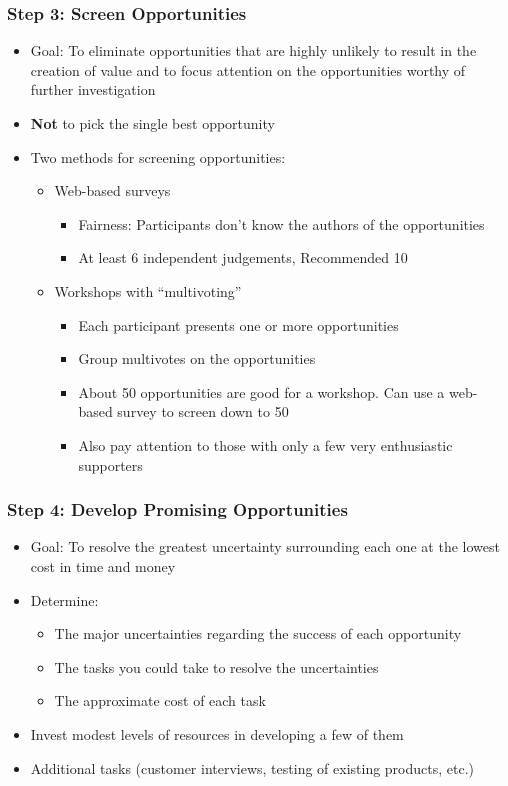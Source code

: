 \documentclass[a4paper,12pt,openany]{book}
\begin{document}
\subsubsection{Step 3: Screen Opportunities}
\begin{itemize}
    \item Goal: To eliminate opportunities that are highly unlikely to result in the creation of value and to focus attention on the opportunities worthy of further investigation
    \item \textbf{Not} to pick the single best opportunity
    \item Two methods for screening opportunities:
    \begin{itemize}
        \item Web-based surveys
        \begin{itemize}
            \item Fairness: Participants don't know the authors of the opportunities
            \item At least 6 independent judgements, Recommended 10
        \end{itemize}
        \item Workshops with ``multivoting''
        \begin{itemize}
            \item Each participant presents one or more opportunities
            \item Group multivotes on the opportunities
            \item About 50 opportunities are good for a workshop. Can use a web-based survey to screen down to 50
            \item Also pay attention to those with only a few very enthusiastic supporters
        \end{itemize}
    \end{itemize}
\end{itemize}

\subsubsection{Step 4: Develop Promising Opportunities}
\begin{itemize}
    \item Goal: To resolve the greatest uncertainty surrounding each one at the lowest cost in time and money
    \item Determine:
    \begin{itemize}
        \item The major uncertainties regarding the success of each opportunity
        \item The tasks you could take to resolve the uncertainties
        \item The approximate cost of each task
    \end{itemize}
    \item Invest modest levels of resources in developing a few of them
    \item Additional tasks (customer interviews, testing of existing products, etc.)
\end{itemize}
\end{document}
